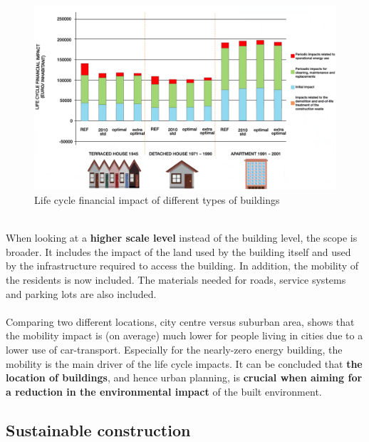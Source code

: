 \documentclass[../summary.tex]{subfiles}
\begin{document}
	
	\begin{figure}[H]
		\centering
		\includegraphics[width=0.9\linewidth]{../images/8-life-cycle-financial-impact.png}
		\caption{Life cycle financial impact of different types of buildings}
		\label{fig:8-life-cycle-financial-impact}
	\end{figure}
	\ \\
	When looking at a \textbf{higher scale level} instead of the building level, the scope is broader. It includes the impact of the land used by the building itself and used by the infrastructure required to access the building. In addition, the mobility of the residents is now included. The materials needed for roads, service systems and parking lots are also included.\\
	\\
	Comparing two different locations, city centre versus suburban area, shows that the mobility impact is (on average) much lower for people living in cities due to a lower use of car-transport. Especially for the nearly-zero energy building, the mobility is the main driver of the life cycle impacts. It can be concluded that \textbf{the location of buildings}, and hence urban planning, is \textbf{crucial when aiming for a reduction in the environmental impact} of the built environment.
	
	\subsection{Sustainable construction}
	
\end{document}
